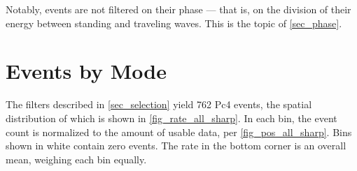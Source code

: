 Notably, events are not filtered on their phase --- that is, on the division of their energy between standing and traveling waves. This is the topic of \cref{sec_phase}. 



\section{Events by Mode}
  \label{sec_rate}

The filters described in \cref{sec_selection} yield 762 Pc4 events, the spatial distribution of which is shown in \cref{fig_rate_all_sharp}. In each bin, the event count is normalized to the amount of usable data, per \cref{fig_pos_all_sharp}. Bins shown in white contain zero events. The rate in the bottom corner is an overall mean, weighing each bin equally. 


